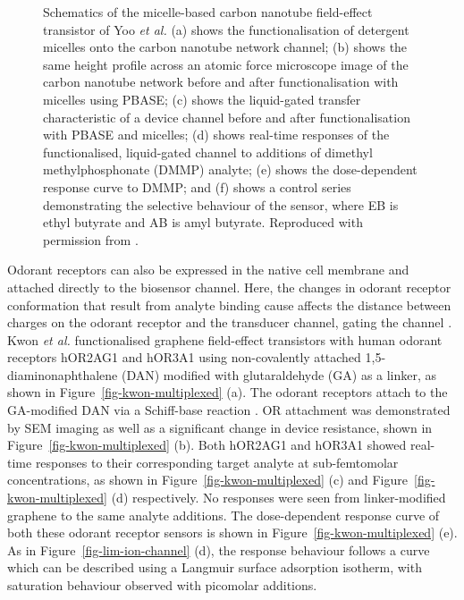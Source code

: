 \documentclass[
  a4paper,
]{scrbook}
\begin{document}
\begin{figure}
\caption{\label{fig-yoo-micelle}Schematics of the micelle-based carbon
nanotube field-effect transistor of Yoo \emph{et al.} (a) shows the
functionalisation of detergent micelles onto the carbon nanotube network
channel; (b) shows the same height profile across an atomic force
microscope image of the carbon nanotube network before and after
functionalisation with micelles using PBASE; (c) shows the liquid-gated
transfer characteristic of a device channel before and after
functionalisation with PBASE and micelles; (d) shows real-time responses
of the functionalised, liquid-gated channel to additions of dimethyl
methylphosphonate (DMMP) analyte; (e) shows the dose-dependent response
curve to DMMP; and (f) shows a control series demonstrating the
selective behaviour of the sensor, where EB is ethyl butyrate and AB is
amyl butyrate. Reproduced with permission from \autocite{Yoo2022}.}

\end{figure}

Odorant receptors can also be expressed in the native cell membrane and
attached directly to the biosensor channel. Here, the changes in odorant
receptor conformation that result from analyte binding cause affects the
distance between charges on the odorant receptor and the transducer
channel, gating the channel \autocite{Kwon2015,Dung2018}. Kwon \emph{et
al.} functionalised graphene field-effect transistors with human odorant
receptors hOR2AG1 and hOR3A1 using non-covalently attached
1,5-diaminonaphthalene (DAN) modified with glutaraldehyde (GA) as a
linker, as shown in Figure~\ref{fig-kwon-multiplexed} (a). The odorant
receptors attach to the GA-modified DAN via a Schiff-base reaction
\autocite{Subasi2022}. OR attachment was demonstrated by SEM imaging as
well as a significant change in device resistance, shown in
Figure~\ref{fig-kwon-multiplexed} (b). Both hOR2AG1 and hOR3A1 showed
real-time responses to their corresponding target analyte at
sub-femtomolar concentrations, as shown in
Figure~\ref{fig-kwon-multiplexed} (c) and
Figure~\ref{fig-kwon-multiplexed} (d) respectively. No responses were
seen from linker-modified graphene to the same analyte additions. The
dose-dependent response curve of both these odorant receptor sensors is
shown in Figure~\ref{fig-kwon-multiplexed} (e). As in
Figure~\ref{fig-lim-ion-channel} (d), the response behaviour follows a
curve which can be described using a Langmuir surface adsorption
isotherm, with saturation behaviour observed with picomolar additions.
\end{document}
